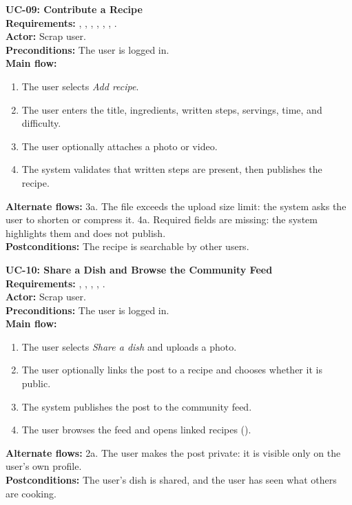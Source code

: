 \begin{sloppypar}
\medskip\noindent\textbf{UC-09: Contribute a Recipe}\\
\textbf{Requirements:} , , , , , , .\\
\textbf{Actor:} Scrap user.\\
\textbf{Preconditions:} The user is logged in.\\
\textbf{Main flow:}
\begin{enumerate}
\item The user selects \textit{Add recipe}.
\item The user enters the title, ingredients, written steps, servings, time, and difficulty.
\item The user optionally attaches a photo or video.
\item The system validates that written steps are present, then publishes the recipe.
\end{enumerate}
\textbf{Alternate flows:} 3a. The file exceeds the upload size limit: the system asks the user to shorten or compress it. \quad 4a. Required fields are missing: the system highlights them and does not publish.\\
\textbf{Postconditions:} The recipe is searchable by other users.

\medskip\noindent\textbf{UC-10: Share a Dish and Browse the Community Feed}\\
\textbf{Requirements:} , , , , .\\
\textbf{Actor:} Scrap user.\\
\textbf{Preconditions:} The user is logged in.\\
\textbf{Main flow:}
\begin{enumerate}
\item The user selects \textit{Share a dish} and uploads a photo.
\item The user optionally links the post to a recipe and chooses whether it is public.
\item The system publishes the post to the community feed.
\item The user browses the feed and opens linked recipes ().
\end{enumerate}
\textbf{Alternate flows:} 2a. The user makes the post private: it is visible only on the user's own profile.\\
\textbf{Postconditions:} The user's dish is shared, and the user has seen what others are cooking.


\end{sloppypar}
